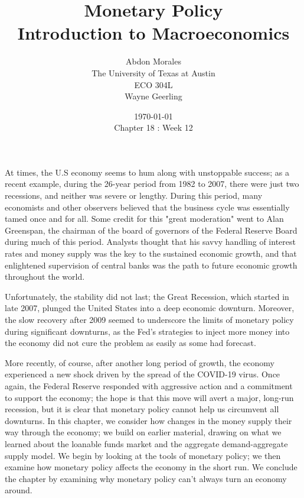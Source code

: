 \documentclass[11pt]{article} %
\title{Monetary Policy \\ Introduction to Macroeconomics}
\author{Abdon Morales \\ The University of Texas at Austin \\ ECO 304L \\ Wayne Geerling}
\date{\today \\ Chapter 18 : Week 12}
\begin{document}
\maketitle
At times, the U.S economy seems to hum along with unstoppable success; as a recent example, during the 26-year period from 1982 to 2007, there were just two recessions, and neither was severe or lengthy. During this period, many economists and other observers believed that the business cycle was essentially tamed once and for all. Some credit for this "great moderation" went to Alan Greenspan, the chairman of the board of governors of the Federal Reserve Board during much of this period. Analysts thought that his savvy handling of interest rates and money supply was the key to the sustained economic growth, and that enlightened supervision of central banks was the path to future economic growth throughout the world.

Unfortunately, the stability did not last; the Great Recession, which started in late 2007, plunged the United States into a deep economic downturn. Moreover, the slow recovery after 2009 seemed to underscore the limits of monetary policy during significant downturns, as the Fed's strategies to inject more money into the economy did not cure the problem as easily as some had forecast.

More recently, of course, after another long period of growth, the economy experienced a new shock driven by the spread of the COVID-19 virus. Once again, the Federal Reserve responded with aggressive action and a commitment to support the economy; the hope is that this move will avert a major, long-run recession, but it is clear that monetary policy cannot help us circumvent all downturns. In this chapter, we consider how changes in the money supply their way through the economy; we build on earlier material, drawing on what we learned about the loanable funds market and the aggregate demand-aggregate supply model. We begin by looking at the tools of monetary policy; we then examine how monetary policy affects the economy in the short run. We conclude the chapter by examining why monetary policy can't always turn an economy around.
\end{document}
